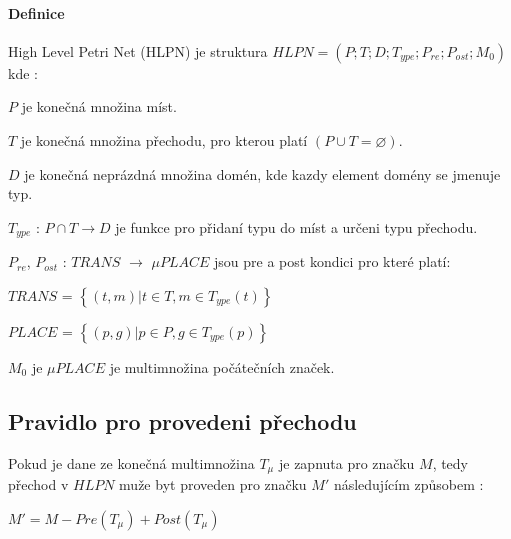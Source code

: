 \paragraph{Definice}

High Level Petri Net (HLPN) je struktura $HLPN = \left( P; T; D; T_{ype}; P_{re}; P_{ost}; M_0\right) $ kde \cite[p.11--12]{pnstd54}:

\begin{itemize}
  \item $P$ je konečná množina míst. \\
  \item $T$ je konečná množina přechodu, pro kterou platí $\left(P \cup T = \varnothing\right)$. \\
  \item $D$ je konečná neprázdná množina domén, kde kazdy element domény se jmenuje typ. \\
  \item $T_{ype}$ : $P \cap T \rightarrow D$ je funkce pro přidaní typu do míst a určeni typu přechodu.
  \item $P_{re}$, $P_{ost}$ : $TRANS$ $\rightarrow$ $\mu PLACE$ jsou pre a post kondici pro které platí: \\
  \begin{center}
    \item $TRANS$ = $\left\{\left(t, m\right) | t \in T, m \in T_{ype} \left( t \right)\right\}$ \\
    \item $PLACE$ = $\left\{\left(p, g\right) | p \in P, g \in T_{ype} \left( p \right)\right\}$ \\
  \end{center}
  \item $M_0$ je $\mu PLACE$ je multimnožina počátečních značek.
\end{itemize}

\subsection{Pravidlo pro provedeni přechodu}
Pokud je dane ze konečná multimnožina $T_\mu$ je zapnuta pro značku $M$, tedy přechod v $HLPN$ muže byt proveden pro značku $M'$ následujícím způsobem \cite[p.~12]{pnstd54}:
\begin{center}
  $M' = M - Pre(T_\mu) + Post(T_\mu)$
\end{center}


